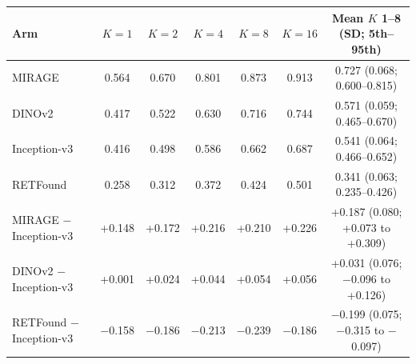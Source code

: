 \begin{tabular}{@{}lcccccc@{}}
\toprule
Arm & $K=1$ & $K=2$ & $K=4$ & $K=8$ & $K=16$ & \makecell{Mean $K$ 1--8\\(SD; 5th--95th)} \\
\midrule
MIRAGE & 0.564 & 0.670 & 0.801 & 0.873 & 0.913 & 0.727 (0.068; 0.600--0.815) \\
DINOv2 & 0.417 & 0.522 & 0.630 & 0.716 & 0.744 & 0.571 (0.059; 0.465--0.670) \\
Inception-v3 & 0.416 & 0.498 & 0.586 & 0.662 & 0.687 & 0.541 (0.064; 0.466--0.652) \\
RETFound & 0.258 & 0.312 & 0.372 & 0.424 & 0.501 & 0.341 (0.063; 0.235--0.426) \\
\midrule
MIRAGE $-$ Inception-v3 & +0.148 & +0.172 & +0.216 & +0.210 & +0.226 & +0.187 (0.080; +0.073 to +0.309) \\
DINOv2 $-$ Inception-v3 & +0.001 & +0.024 & +0.044 & +0.054 & +0.056 & +0.031 (0.076; $-$0.096 to +0.126) \\
RETFound $-$ Inception-v3 & $-$0.158 & $-$0.186 & $-$0.213 & $-$0.239 & $-$0.186 & $-$0.199 (0.075; $-$0.315 to $-$0.097) \\
\bottomrule
\end{tabular}
